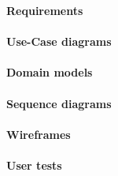 \large{
\textbf{Requirements}
}

\paragraph{Use-Case diagrams}


\paragraph{Domain models}


\paragraph{Sequence diagrams}


\paragraph{Wireframes}


\paragraph{User tests}

